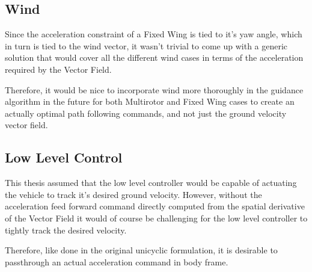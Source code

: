 \subsection{Wind}
Since the acceleration constraint of a Fixed Wing is tied to it's yaw angle, which in turn is tied to the wind vector, it wasn't trivial to come up with a generic solution that would cover all the different wind cases in terms of the acceleration required by the Vector Field.

Therefore, it would be nice to incorporate wind more thoroughly in the guidance algorithm in the future for both Multirotor and Fixed Wing cases to create an actually optimal path following commands, and not just the ground velocity vector field.

\subsection{Low Level Control}
This thesis assumed that the low level controller would be capable of actuating the vehicle to track it's desired ground velocity. However, without the acceleration feed forward command directly computed from the spatial derivative of the Vector Field it would of course be challenging for the low level controller to tightly track the desired velocity.

Therefore, like done in the original unicyclic formulation, it is desirable to passthrough an actual acceleration command in body frame.